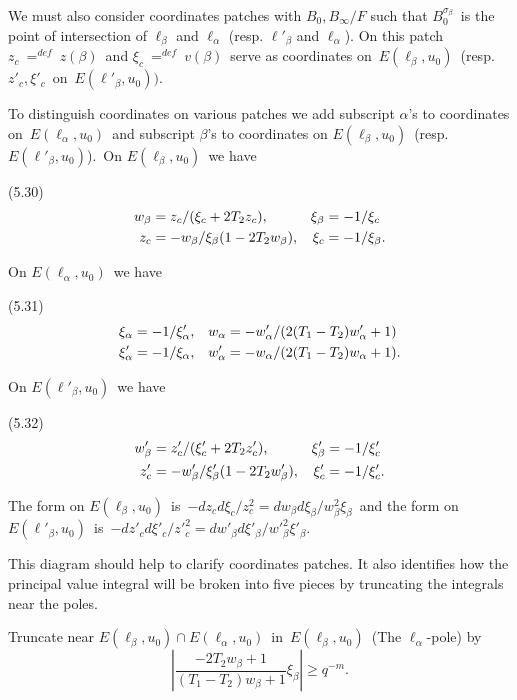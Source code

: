 We must also consider coordinates patches with  $B_0,B_\infty/F$  such that
$B_0^{\sigma_\beta}$\  is the point of intersection of  $\ell_\beta$  and
$\ell_\alpha$  (resp.  $\ell'_\beta$  and  $\ell_\alpha$).  On this patch
$z_c~ {\mathrel{\mathop=^{def}}}~z(\beta)$\  and $\xi_c~{\mathrel{\mathop=^{def}}}~
v(\beta)$\  serve as coordinates on\ $E(\ell_\beta, u_0)$\ (resp.
$z'_c, \xi'_c$\ on\ $E(\ell'_\beta, u_0))$.

To distinguish coordinates on various patches we add subscript $\alpha$'s to
coordinates on\ $E(\ell_\alpha,u_0)$\ and subscript $\beta$'s to coordinates
on  $E(\ell_\beta, u_0)$\ (resp.\ $E(\ell'_\beta, u_0)$).\  On $E(\ell_\beta, u_0)$\
we have

\noindent (5.30)
$$
\aligned
w_\beta &= z_c/(\xi_c + 2T_2z_c), \\  z_c &= -w_\beta/\xi_\beta(1-2T_2w_\beta),
\endaligned  \quad
\aligned  \xi_\beta &= -1/\xi_c\\ \xi_c &= -1/\xi_\beta .
\endaligned
$$

\noindent On  $E(\ell_\alpha,u_0)$\  we have

\noindent (5.31)
$$
\aligned
\xi_\alpha &= -1/\xi'_\alpha, \\  \xi'_\alpha &= -1/\xi_\alpha,
\endaligned \quad
\aligned  w_\alpha &= -w'_\alpha/(2(T_1-T_2)w'_\alpha+1) \\
w'_\alpha &= -w_\alpha/(2(T_1-T_2)w_\alpha + 1)	.
\endaligned
$$

\noindent On  $E(\ell'_\beta,u_0)$\ we have

\noindent (5.32)
$$
\aligned
w'_\beta &= z'_c/(\xi'_c + 2T_2z'_c), \\ z'_c &= -w'_\beta/\xi'_\beta(1-2T_2w'_\beta),
\endaligned \quad
\aligned  \xi'_\beta &= -1/\xi'_c \\ \xi'_c &= -1/\xi'_c.  \endaligned
$$

\flushpar
The form on $E(\ell_\beta,u_0)$\ is\ $-dz_cd\xi_c/z^2_c 
= dw_\beta d\xi_\beta/w^2_\beta\xi_\beta$\
and the form on\ $E(\ell'_\beta,u_0)$\ is\ $-dz'_cd\xi'_c/z'^2_c = 
dw'_\beta d\xi'_\beta/w'^2_\beta\xi'_\beta$.



\midspace {6.5in} \caption{\noindent This diagram 
should help to clarify coordinates patches.  It also 
identifies how the principal value integral will be broken into five pieces by
truncating the integrals near the poles.}

Truncate near  $E(\ell_\beta,u_0) \cap E(\ell_\alpha,u_0)$\ in\ $E(\ell_\beta,u_0)$\
(The $\ell_\alpha$-pole) by
$$
\left| {\frac{-2T_2w_\beta +1}{(T_1-T_2)w_\beta +1}} \xi_\beta \right| \ge
q^{-m} .
$$

